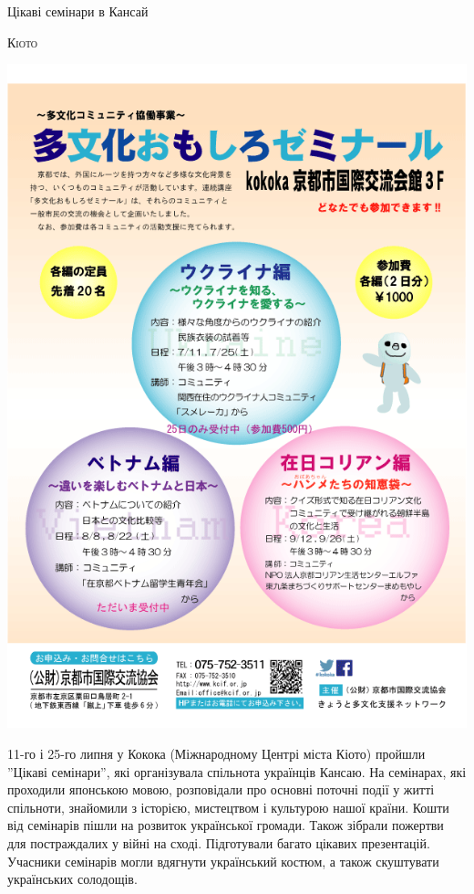 \documentclass[10pt,a4paper]{article}
\newcommand{\NewsItem}[1]{%
		\usefont{T2A}{iwona}{m}{n} 
		\large #1 \vspace{4pt}
		\par \normalsize \normalfont}
\newcommand{\NewsAuthor}[1]{%
			\hfill \textsc{#1} \vspace{4pt}
			\par \normalfont}
\begin{document}
\begin{multicols}{3}
\vspace{1cm}
\NewsItem{Цікаві семінари в Кансай}
\NewsAuthor{Кіото}
		\begin{center}
			\includegraphics[width=0.8\linewidth]{images/seminary}
		\end{center}
11-го і 25-го липня у Кокока (Міжнародному Центрі міста Кіото) пройшли ''Цікаві семінари'', які організувала спільнота українців Кансаю. На семінарах, які проходили японською мовою, розповідали про основні поточні події у житті спільноти, знайомили з історією, мистецтвом і культурою нашої країни. Кошти від семінарів пішли на розвиток української громади. Також зібрали пожертви для постраждалих у війні на сході. Підготували багато цікавих презентацій. Учасники семінарів могли вдягнути український костюм, а також скуштувати українських солодощів.


\end{multicols}
\end{document}
